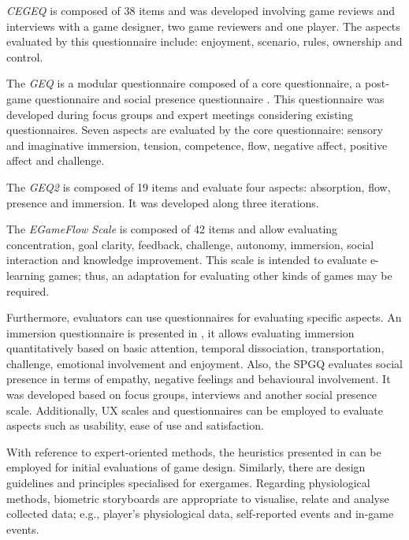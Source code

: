 \textit{\ac{CEGEQ}} \autocite{Calvillo-Gamez2015} is composed of 38 items and was developed involving game reviews and interviews with a game designer, two game reviewers and one player. The aspects evaluated by this questionnaire include: enjoyment, scenario, rules, ownership and control.

The \textit{\ac{GEQ}} is a modular questionnaire composed of a core questionnaire, a post-game questionnaire and social presence questionnaire \autocite{Poels2008}. This questionnaire was developed during focus groups and expert meetings considering existing questionnaires. Seven aspects are evaluated by the core questionnaire: sensory and imaginative immersion, tension, competence, flow, negative affect, positive affect and challenge.

The \textit{\ac{GEQ2}} \autocite{Brockmyer2009} is composed of 19 items and evaluate four aspects: absorption, flow, presence and immersion. It was developed along three iterations.

The \textit{EGameFlow Scale} \autocite{Fu2009} is composed of 42 items and allow evaluating concentration, goal clarity, feedback, challenge, autonomy, immersion, social interaction and knowledge improvement. This scale is intended to evaluate e-learning games; thus, an adaptation for evaluating other kinds of games may be required.

Furthermore, evaluators can use questionnaires for evaluating specific aspects. An immersion questionnaire is presented in \autocite{jennett2008measuring}, it allows evaluating immersion quantitatively based on basic attention, temporal dissociation, transportation, challenge, emotional involvement and enjoyment. Also, the \ac{SPGQ} \autocite{DeKort2007} evaluates social presence in terms of empathy, negative feelings and behavioural involvement. It was developed based on focus groups, interviews and another social presence scale. Additionally, \ac{UX} scales \autocite{Brooke1996} and questionnaires \autocite{Laugwitz2008,Hassenzahl2003,lund2001measuring} can be employed to evaluate aspects such as usability, ease of use and satisfaction.

With reference to expert-oriented methods, the heuristics presented in \autocite{Desurvire2009,Tondello2016} can be employed for initial evaluations of game design. Similarly, there are design guidelines \autocite{Wiemeyer2015,Isbister2015,Mueller2014} and principles \autocite{Berkovsky2010} specialised for exergames. Regarding physiological methods, biometric storyboards \autocite{Mirza-Babaei2014} are appropriate to visualise, relate and analyse collected data; e.g., player's physiological data, self-reported events and in-game events.

